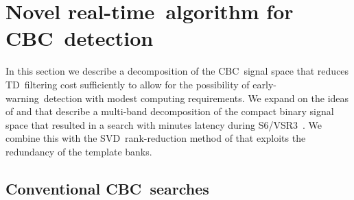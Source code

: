 \documentclass[preprint2]{aastex}
\newcommand{\earlywarning}{early-warning}
\newcommand{\CBC}{CBC}%
\newcommand{\realtime}{real-time}
\newcommand{\SVD}{SVD}%
\newcommand{\TD}{TD}%
\begin{document}
\section{Novel \realtime\ algorithm for \CBC\ detection}
\label{sec:method}

In this section we describe a decomposition of the \CBC\ signal space that
reduces \TD\ filtering cost sufficiently to allow for the
possibility of \earlywarning\ detection with modest computing requirements.  We
expand on the ideas of \citet{Marion2004} and \citet{Buskulic2010} that describe a
multi-band decomposition of the compact binary signal space that resulted in
a search with minutes latency during S6/VSR3~\citep{HugheyGWPAW2011}.  We combine this
with the \SVD\ rank-reduction method of \citet{Cannon:2010p10398} that exploits
the redundancy of the template banks.

\subsection{Conventional \CBC\ searches}
\end{document}
